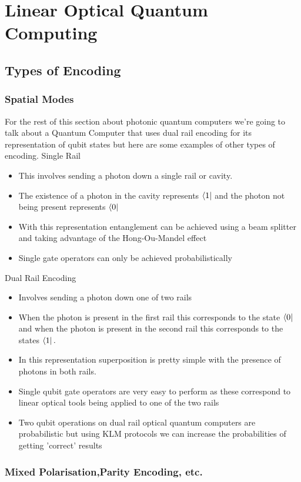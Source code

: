 \section{Linear Optical Quantum Computing}
\subsection{Types of Encoding}
\subsubsection{Spatial Modes}
For the rest of this section about photonic quantum computers we're going to talk about a Quantum Computer that uses dual rail encoding for its representation of qubit states but here are some examples of other types of encoding.
Single Rail
\begin{itemize}
    \item This involves sending a photon down a single rail or cavity.
    \item The existence of a photon in the cavity represents $\bra{1}$ and the photon not being present represents $\bra{0}$
    \item With this representation entanglement can be achieved using a beam splitter and taking advantage of the Hong-Ou-Mandel effect
    \item Single gate operators can only be achieved probabilistically
\end{itemize}
Dual Rail Encoding
\begin{itemize}
    \item Involves sending a photon down one of two rails
    \item When the photon is present in the first rail this corresponds to the state $\bra{0}$ and when the photon is present in the second rail this corresponds to the states $\bra{1}.$
    \item In this representation superposition is pretty simple with the presence of photons in both rails.
    \item Single qubit gate operators are very easy to perform as these correspond to linear optical tools being applied to one of the two rails
    \item Two qubit operations on dual rail optical quantum computers are probabilistic but using KLM protocols we can increase the probabilities of getting 'correct' results 
\end{itemize}
\subsubsection{Mixed Polarisation,Parity Encoding, etc.}

